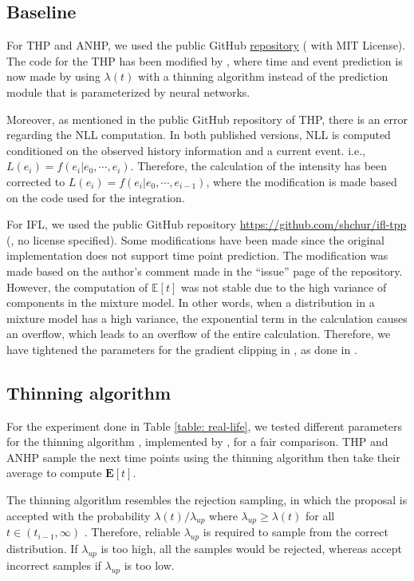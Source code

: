 \subsection{Baseline \label{sec:baselineImplementation}}

For THP and ANHP, we used the public GitHub \href{https://github.com/yangalan123/anhp-andtt}{repository} (\cite{bib:ANHP} with MIT License).
The code for the THP has been modified by \cite{bib:ANHP}, where time and event prediction is now made by using $\lambda(t)$ with a thinning algorithm instead of the prediction module that is parameterized by neural networks.

Moreover, as mentioned in the public GitHub repository of THP, there is an error regarding the NLL computation. In both published versions, NLL is computed conditioned on the observed history information and a current event. i.e., $L(e_i) = f(e_i|e_0, \cdots, e_i)$. Therefore, the calculation of the intensity has been corrected to $L(e_i) = f(e_i|e_0, \cdots, e_{i-1})$, where the modification is made based on the code used for the integration.

For IFL, we used the public GitHub repository \href{https://github.com/shchur/ifl-tpp}{https://github.com/shchur/ifl-tpp} (\cite{bib:ifl}, no license specified). Some modifications have been made since the original implementation does not support time point prediction. The modification was made based on the author's comment made in the ``issue'' page of the repository. However, the computation of $\mathbb{E}[t]$ was not stable due to the high variance of components in the mixture model. In other words, when a distribution in a mixture model has a high variance, the exponential term in the calculation causes an overflow, which leads to an overflow of the entire calculation. 
Therefore, we have tightened the parameters for the gradient clipping in \cite{bib:ifl}, as done in \cite{bib:MetaTPP}.


\subsection{Thinning algorithm\label{appen: thinning}}
For the experiment done in Table \ref{table: real-life}, we tested different parameters for the thinning algorithm \cite{lec:thinning, bib:thinning_ogata}, implemented by \cite{bib:ANHP}, for a fair comparison.
THP and ANHP sample the next time points using the thinning algorithm then take their average to compute $\mathbf{E}[t]$.

The thinning algorithm resembles the rejection sampling, in which the proposal is accepted with the probability $\lambda(t) / \lambda_{up}$ where $\lambda_{up} \geq \lambda(t)$ for all $t\in(t_{i-1}, \infty)$ \cite{bib:nhp}.
Therefore, reliable $\lambda_{up}$ is required to sample from the correct distribution.
If $\lambda_{up}$ is too high, all the samples would be rejected, whereas accept incorrect samples if $\lambda_{up}$ is too low.

